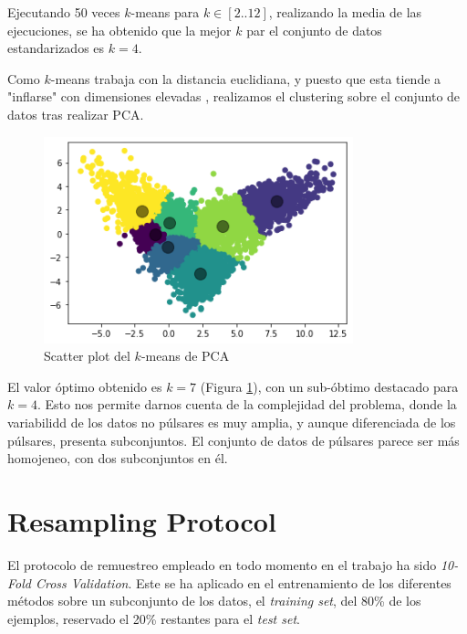 \documentclass[a4paper]{article} %
\begin{document}
Ejecutando 50 veces $k$-means para $k \in [2..12]$, realizando la media de las ejecuciones, se ha obtenido que la mejor $k$ par el conjunto de datos estandarizados es $k = 4$. \vspace{5mm}

Como $k$-means trabaja con la distancia euclidiana, y puesto que esta tiende a "inflarse" con dimensiones elevadas \cite{Scikit:Clustering}, realizamos el clustering sobre el conjunto de datos tras realizar PCA.\vspace{5mm}

\begin{figure}[H]
    \centering
    \includegraphics[width=0.8\textwidth]{ScatterKMeansPCA_7.png}
    \caption{Scatter plot del $k$-means de PCA}
    \label{ScatterKMeansPCA7}
\end{figure}

El valor óptimo obtenido es $k = 7$ (Figura \ref{ScatterKMeansPCA7}), con un sub-óbtimo destacado para $k = 4$. Esto nos permite darnos cuenta de la complejidad del problema, donde la variabilidd de los datos no púlsares es muy amplia, y aunque diferenciada de los púlsares, presenta subconjuntos. El conjunto de datos de púlsares parece ser más homojeneo, con dos subconjuntos en él.


\section{Resampling Protocol}\label{sec: resampling}

El protocolo de remuestreo empleado en todo momento en el trabajo ha sido \textit{10-Fold Cross Validation}. Este se ha aplicado en el entrenamiento de los diferentes métodos sobre un subconjunto de los datos, el \textit{training set}, del 80\% de los ejemplos, reservado el 20\% restantes para el \textit{test set}.\vspace{5mm}
\end{document}
